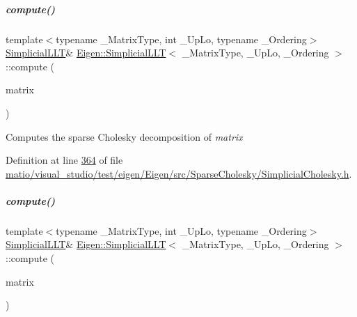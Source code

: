 \mbox{\label{group___sparse_cholesky___module_a24ffa253377a1cec7a44b856fae1f71a}} 
\subparagraph{\texorpdfstring{compute()}{compute()}\hspace{0.1cm}{\footnotesize\ttfamily [1/2]}}
{\footnotesize\ttfamily template$<$typename \+\_\+\+Matrix\+Type, int \+\_\+\+Up\+Lo, typename \+\_\+\+Ordering$>$ \\
\hyperlink{group___sparse_cholesky___module_class_eigen_1_1_simplicial_l_l_t}{Simplicial\+L\+LT}\& \hyperlink{group___sparse_cholesky___module_class_eigen_1_1_simplicial_l_l_t}{Eigen\+::\+Simplicial\+L\+LT}$<$ \+\_\+\+Matrix\+Type, \+\_\+\+Up\+Lo, \+\_\+\+Ordering $>$\+::compute (\begin{DoxyParamCaption}\item[{const Matrix\+Type \&}]{matrix }\end{DoxyParamCaption})\hspace{0.3cm}{\ttfamily [inline]}}

Computes the sparse Cholesky decomposition of {\itshape matrix} 

Definition at line \hyperlink{matio_2visual__studio_2test_2eigen_2_eigen_2src_2_sparse_cholesky_2_simplicial_cholesky_8h_source_l00364}{364} of file \hyperlink{matio_2visual__studio_2test_2eigen_2_eigen_2src_2_sparse_cholesky_2_simplicial_cholesky_8h_source}{matio/visual\+\_\+studio/test/eigen/\+Eigen/src/\+Sparse\+Cholesky/\+Simplicial\+Cholesky.\+h}.

\mbox{\label{group___sparse_cholesky___module_a24ffa253377a1cec7a44b856fae1f71a}} 
\subparagraph{\texorpdfstring{compute()}{compute()}\hspace{0.1cm}{\footnotesize\ttfamily [2/2]}}
{\footnotesize\ttfamily template$<$typename \+\_\+\+Matrix\+Type, int \+\_\+\+Up\+Lo, typename \+\_\+\+Ordering$>$ \\
\hyperlink{group___sparse_cholesky___module_class_eigen_1_1_simplicial_l_l_t}{Simplicial\+L\+LT}\& \hyperlink{group___sparse_cholesky___module_class_eigen_1_1_simplicial_l_l_t}{Eigen\+::\+Simplicial\+L\+LT}$<$ \+\_\+\+Matrix\+Type, \+\_\+\+Up\+Lo, \+\_\+\+Ordering $>$\+::compute (\begin{DoxyParamCaption}\item[{const Matrix\+Type \&}]{matrix }\end{DoxyParamCaption})\hspace{0.3cm}{\ttfamily [inline]}}

